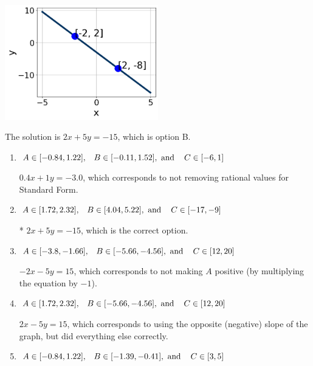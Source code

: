 \documentclass{extbook}[14pt]
\begin{document}
\begin{enumerate}
{\begin{center}
    \includegraphics[width=0.5\textwidth]{../Figures/linearGraphToStandardC.png}
\end{center}




The solution is \( 2x + 5y = -15 \), which is option B.\begin{enumerate}[label=\Alph*.]
\item \( A \in [-0.84, 1.22], \hspace{3mm} B \in [-0.11, 1.52], \text{ and } \hspace{3mm} C \in [-6, 1] \)

 $0.4x + 1y = -3.0$, which corresponds to not removing rational values for Standard Form.
\item \( A \in [1.72, 2.32], \hspace{3mm} B \in [4.04, 5.22], \text{ and } \hspace{3mm} C \in [-17, -9] \)

* $2x + 5y = -15$, which is the correct option.
\item \( A \in [-3.8, -1.66], \hspace{3mm} B \in [-5.66, -4.56], \text{ and } \hspace{3mm} C \in [12, 20] \)

 $-2x - 5y = 15$, which corresponds to not making $A$ positive (by multiplying the equation by $-1$).
\item \( A \in [1.72, 2.32], \hspace{3mm} B \in [-5.66, -4.56], \text{ and } \hspace{3mm} C \in [12, 20] \)

 $2x - 5y = 15$, which corresponds to using the opposite (negative) slope of the graph, but did everything else correctly.
\item \( A \in [-0.84, 1.22], \hspace{3mm} B \in [-1.39, -0.41], \text{ and } \hspace{3mm} C \in [3, 5] \)


\end{enumerate}}
\end{enumerate}
\end{document}
